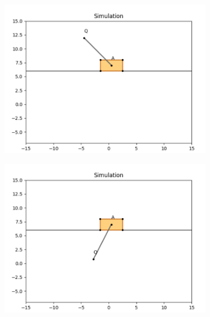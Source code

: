 \documentclass{article}
\begin{document}
\begin{figure}[htbp]
  \centering
  \begin{subfigure}[t]{0.45\linewidth}
    \centering
    \includegraphics[width=\linewidth]{simulation/init3_1.png}
    \caption{}
  \end{subfigure}
  \begin{subfigure}[t]{0.45\linewidth}
    \centering
    \includegraphics[width=\linewidth]{simulation/init3_2.png}
    \caption{}
  \end{subfigure}
  \begin{subfigure}[t]{0.45\linewidth}
    \centering

\end{subfigure}
\end{figure}
\end{document}
